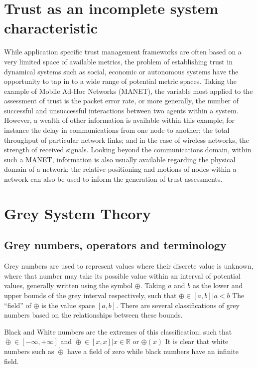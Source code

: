 \documentclass[conference]{IEEEtran}
\begin{document}
\section{Trust as an incomplete system characteristic}

While application specific trust management frameworks are often based on a very limited space of available metrics, the problem of establishing trust in dynamical systems such as social, economic or autonomous systems have the opportunity to tap in to a wide range of potential metric spaces. 
Taking the example of Mobile Ad-Hoc Networks (MANET), the variable most applied to the assessment of trust is the packet error rate, or more generally, the number of successful and unsuccessful interactions between two agents within a system.
However, a wealth of other information is available within this example; for instance the delay in communications from one node to another; the total throughput of particular network links; and in the case of wireless networks, the strength of received signals.
Looking beyond the communications domain, within such a MANET, information is also usually available regarding the physical domain of a network; the relative positioning and motions of nodes within a network can also be used to inform the generation of trust assessments.

\section{Grey System Theory}

\subsection{Grey numbers, operators and terminology}

Grey numbers are used to represent values where their discrete value is unknown, where that number may take its possible value within an interval of potential values, generally written using the symbol $\oplus$.
Taking $a$ and $b$ as the lower and upper bounds of the grey interval respectively, such that $\oplus \in [a,b] | a < b$ 
The ``field'' of $\oplus$ is the value space $[a,b]$.
There are several classifications of grey numbers based on the relationships between these bounds.

Black and White numbers are the extremes of this classification; such that $\dot\oplus \in [-\infty, +\infty]$ and $\mathring\oplus \in [x, x] | x \in \mathbb{R}$ or $\oplus(x)$
It is clear that white numbers such as $\mathring\oplus$ have a field of zero while black numbers have an infinite field.
\end{document}
